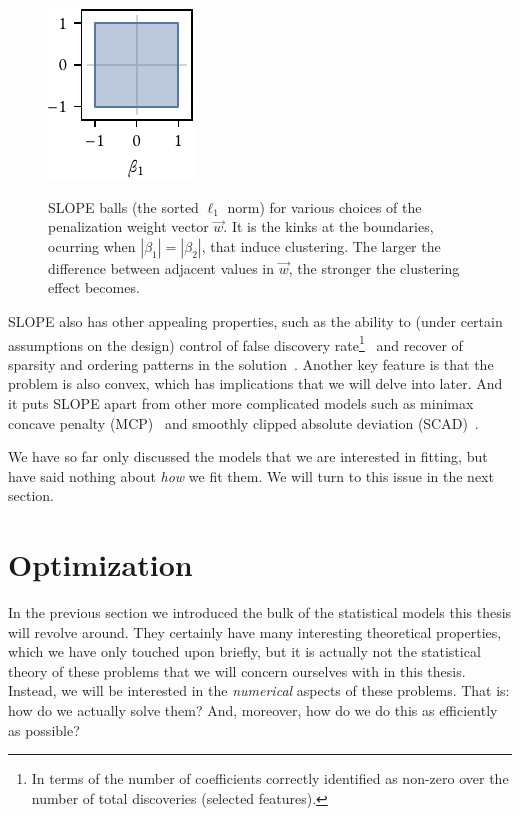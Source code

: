 \begin{figure}[htpb]
{  }{\includegraphics{figures/slope-ball-3.pdf}}
  \caption{%
    SLOPE balls (the sorted \(\ell_1\) norm) for various choices of the penalization weight vector \(\vec{w}\). It is the kinks at the boundaries, ocurring when \(|\beta_1| =|\beta_2|\), that induce clustering. The larger the difference between adjacent values in \(\vec{w}\), the stronger the clustering effect becomes.
  }
  \label{fig:slope-balls}
\end{figure}

SLOPE also has other appealing properties, such as the ability to (under certain assumptions on the design) control of false discovery rate\footnote{In terms of the number of coefficients correctly identified as non-zero over the number of total discoveries (selected features).}~\parencite{bogdan2015} and recover of sparsity and ordering patterns in the solution~\parencite{bogdan2022}. Another key feature is that the problem is also convex, which has implications that we will delve into later. And it puts SLOPE apart from other more complicated models such as minimax concave penalty (MCP)~\parencite{zhang2010} and smoothly clipped absolute deviation (SCAD)~\parencite{fan2001}.

We have so far only discussed the models that we are interested in fitting, but have said nothing about \emph{how} we fit them. We will turn to this issue in the next section.

\section{Optimization}\label{sec:optimization}

In the previous section we introduced the bulk of the statistical models this thesis will revolve around. They certainly have many interesting theoretical properties, which we have only touched upon briefly, but it is actually not the statistical theory of these problems that we will concern ourselves with in this thesis. Instead, we will be interested in the \emph{numerical} aspects of these problems. That is: how do we actually solve them? And, moreover, how do we do this as efficiently as possible?


